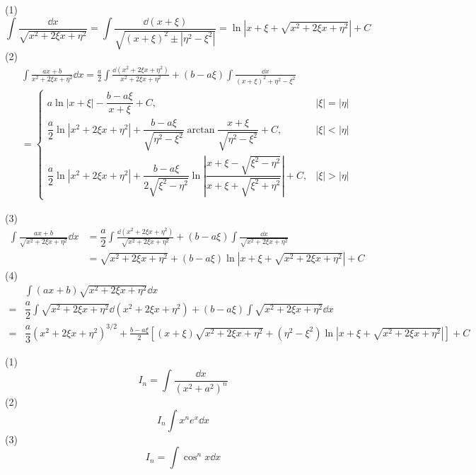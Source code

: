 \begin{solution}
	(1)\[\int \frac{\dd x}{\sqrt{x^2 + 2\xi x + \eta^2}} = \int \frac{\dd(x + \xi)}{\sqrt{(x + \xi)^2 \pm |\eta^2 - \xi^2|}} = \ln \left| x + \xi + \sqrt{x^2 + 2\xi x + \eta^2} \right| + C\]
	(2)$$\begin{aligned}
		&\int \frac{ax + b}{x^2 + 2\xi x + \eta^2} \dd x
		= \frac{a}{2} \int \frac{\dd(x^2 + 2\xi x + \eta^2)}{x^2 + 2\xi x + \eta^2} + (b - a\xi) \int \frac{\dd x}{(x+\xi)^2+\eta^2-\xi^2} \\
		&= \begin{cases}
			a \ln \left| x + \xi  \right| - \dfrac{b - a\xi}{x+\xi}  + C, & |\xi| =|\eta| \\
			\dfrac{a}{2} \ln \left| x^2 + 2\xi x + \eta^2 \right| + \dfrac{b - a\xi}{\sqrt{\eta^2 - \xi^2}} \arctan\dfrac{x+\xi}{\sqrt{\eta^2-\xi^2}} + C, & |\xi| < |\eta| \\
			\dfrac{a}{2} \ln \left| x^2 + 2\xi x + \eta^2 \right| + \dfrac{b - a\xi}{2\sqrt{\xi^2 - \eta^2}}\ln \left| \dfrac{x + \xi - \sqrt{\xi^2 - \eta^2}}{x + \xi + \sqrt{\xi^2 + \eta^2}} \right|  + C, & |\xi| > |\eta|
		\end{cases}
	\end{aligned}$$
	
	(3)\[\begin{aligned}
		\int \frac{ax + b}{\sqrt{x^2 + 2\xi x + \eta^2}} \dd x
		&= \dfrac{a}{2} \int \frac{\dd(x^2 + 2\xi x + \eta^2)}{\sqrt{x^2 + 2\xi x + \eta^2}} + (b - a\xi) \int \frac{\dd x}{\sqrt{x^2 + 2\xi x + \eta^2}} \\
		&= \sqrt{x^2 + 2\xi x + \eta^2} +(b - a\xi)\ln|x+\xi+ \sqrt{x^2 + 2\xi x + \eta^2}|+C
	\end{aligned}\]
	(4)\[\begin{aligned}
		&\int(ax+b) \sqrt{x^2 + 2\xi x + \eta^2}\dd x\\
		=&\dfrac{a}{2}\int \sqrt{x^2 + 2\xi x + \eta^2}\dd( x^2 + 2\xi x + \eta^2)+(b-a\xi)\int \sqrt{x^2 + 2\xi x + \eta^2}\dd x\\
		=&\dfrac{a}{3} (x^2 + 2\xi x + \eta^2)^{3/2}+\frac{b-a\xi}{2}[(x+\xi) \sqrt{x^2 + 2\xi x + \eta^2}+(\eta^2-\xi^2)\ln|x+\xi+ \sqrt{x^2 + 2\xi x + \eta^2}|]+C
	\end{aligned}\]
\end{solution}
\begin{problem}\label{积分10}
	(1)$$I_n=\int \frac{\dd x}{(x^2+a^2)^n}$$
	(2)\[I_n\int x^ne^x\dd x\]
	(3)\[I_n=\int\cos^nx\dd x\]
\end{problem}
\newpage
